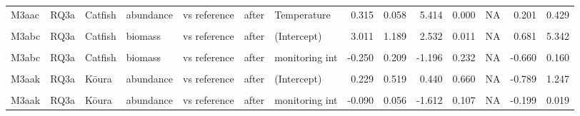 \documentclass[
  12pt,
  a4paper,
  oneside]{scrbook}
\begin{document}
\begin{landscape}
\begin{longtable}[t]{lllllllrrrrrrr}
M3aac & RQ3a & Catfish & abundance & vs reference & after & Temperature & 0.315 & 0.058 & 5.414 & 0.000 & NA & 0.201 & 0.429\\
\cellcolor{gray!8}{M3aac} & \cellcolor{gray!8}{RQ3a} & \cellcolor{gray!8}{Catfish} & \cellcolor{gray!8}{abundance} & \cellcolor{gray!8}{vs reference} & \cellcolor{gray!8}{after} & \cellcolor{gray!8}{siteStone pile:monitoring int} & \cellcolor{gray!8}{0.510} & \cellcolor{gray!8}{0.398} & \cellcolor{gray!8}{1.283} & \cellcolor{gray!8}{0.199} & \cellcolor{gray!8}{0.559} & \cellcolor{gray!8}{-0.269} & \cellcolor{gray!8}{1.290}\\
M3abc & RQ3a & Catfish & biomass & vs reference & after & (Intercept) & 3.011 & 1.189 & 2.532 & 0.011 & NA & 0.681 & 5.342\\
\cellcolor{gray!8}{M3abc} & \cellcolor{gray!8}{RQ3a} & \cellcolor{gray!8}{Catfish} & \cellcolor{gray!8}{biomass} & \cellcolor{gray!8}{vs reference} & \cellcolor{gray!8}{after} & \cellcolor{gray!8}{siteStone pile} & \cellcolor{gray!8}{-4.370} & \cellcolor{gray!8}{3.059} & \cellcolor{gray!8}{-1.429} & \cellcolor{gray!8}{0.153} & \cellcolor{gray!8}{NA} & \cellcolor{gray!8}{-10.366} & \cellcolor{gray!8}{1.626}\\
\addlinespace
M3abc & RQ3a & Catfish & biomass & vs reference & after & monitoring int & -0.250 & 0.209 & -1.196 & 0.232 & NA & -0.660 & 0.160\\
\cellcolor{gray!8}{M3abc} & \cellcolor{gray!8}{RQ3a} & \cellcolor{gray!8}{Catfish} & \cellcolor{gray!8}{biomass} & \cellcolor{gray!8}{vs reference} & \cellcolor{gray!8}{after} & \cellcolor{gray!8}{siteStone pile:monitoring int} & \cellcolor{gray!8}{0.689} & \cellcolor{gray!8}{0.638} & \cellcolor{gray!8}{1.081} & \cellcolor{gray!8}{0.280} & \cellcolor{gray!8}{0.559} & \cellcolor{gray!8}{-0.560} & \cellcolor{gray!8}{1.939}\\
M3aak & RQ3a & Kōura & abundance & vs reference & after & (Intercept) & 0.229 & 0.519 & 0.440 & 0.660 & NA & -0.789 & 1.247\\
\cellcolor{gray!8}{M3aak} & \cellcolor{gray!8}{RQ3a} & \cellcolor{gray!8}{Kōura} & \cellcolor{gray!8}{abundance} & \cellcolor{gray!8}{vs reference} & \cellcolor{gray!8}{after} & \cellcolor{gray!8}{siteStone pile} & \cellcolor{gray!8}{0.217} & \cellcolor{gray!8}{0.901} & \cellcolor{gray!8}{0.240} & \cellcolor{gray!8}{0.810} & \cellcolor{gray!8}{NA} & \cellcolor{gray!8}{-1.550} & \cellcolor{gray!8}{1.984}\\
M3aak & RQ3a & Kōura & abundance & vs reference & after & monitoring int & -0.090 & 0.056 & -1.612 & 0.107 & NA & -0.199 & 0.019\\

\end{longtable}
\end{landscape}
\end{document}
